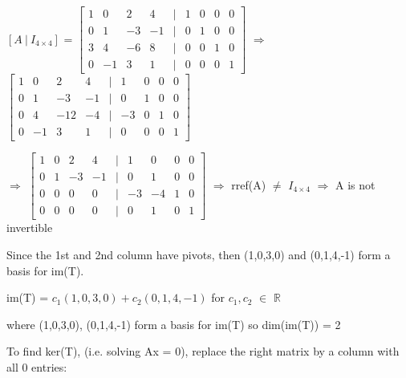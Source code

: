     \begin{tbox}
        $[A \ | \ I_{4 \times 4}]$ =
        \footnotesize
        $\begin{bmatrix}
            1 & 0 & 2 & 4 & | & 1 & 0 & 0 & 0 \\
            0 & 1 & -3 & -1 & | & 0 & 1 & 0 & 0 \\
            3 & 4 & -6 & 8 & | & 0 & 0 & 1 & 0 \\
            0 & -1 & 3 & 1 & | & 0 & 0 & 0 & 1
        \end{bmatrix}$
        $\Rightarrow$
        $\begin{bmatrix}
            1 & 0 & 2 & 4 & | & 1 & 0 & 0 & 0 \\
            0 & 1 & -3 & -1 & | & 0 & 1 & 0 & 0 \\
            0 & 4 & -12 & -4 & | & -3 & 0 & 1 & 0 \\
            0 & -1 & 3 & 1 & | & 0 & 0 & 0 & 1
        \end{bmatrix}$

        $\Rightarrow$
        $\begin{bmatrix}
            1 & 0 & 2 & 4 & | & 1 & 0 & 0 & 0 \\
            0 & 1 & -3 & -1 & | & 0 & 1 & 0 & 0 \\
            0 & 0 & 0 & 0 & | & -3 & -4 & 1 & 0 \\
            0 & 0 & 0 & 0 & | & 0 & 1 & 0 & 1
        \end{bmatrix}$
        \normalsize
        $\Rightarrow$
        rref(A) $\not =$ $I_{4 \times 4}$
        $\Rightarrow$
        A is not invertible

        \vspace{0.3cm}

        Since the 1st and 2nd column have pivots,
        then (1,0,3,0) and (0,1,4,-1) form a basis for im(T).

        \hspace{0.5cm}
        im(T) = $c_1(1,0,3,0) + c_2(0,1,4,-1)$
        \hspace{0.5cm}
        for $c_1,c_2$ $\in$ $\mathbb{R}$

        \hspace{0.5cm}
        where (1,0,3,0), (0,1,4,-1) form a basis for im(T) so dim(im(T)) = 2

        \vspace{0.3cm}

        To find ker(T), (i.e. solving Ax = 0),
        replace the right matrix by a column with all 0 entries:


\end{tbox}
